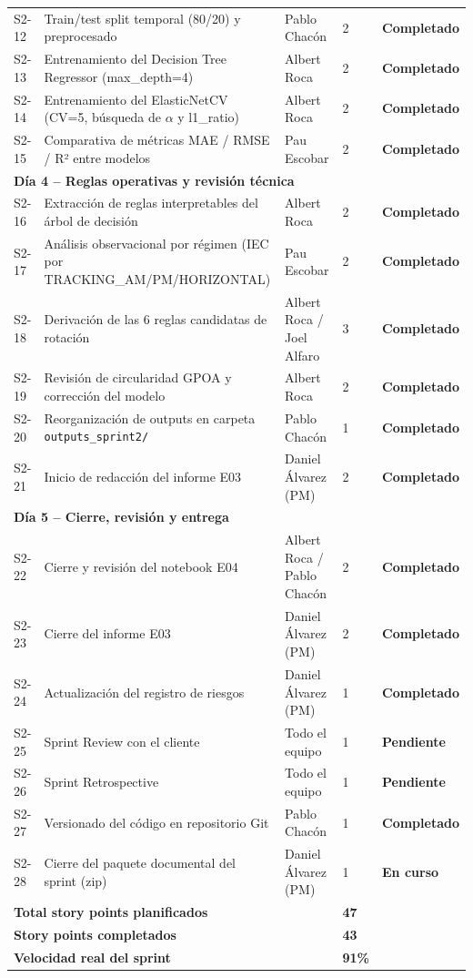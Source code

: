 \documentclass[12pt,a4paper]{article}
\newcommand{\done}{\textcolor{completed}{\textbf{Completado}}}
\newcommand{\pend}{\textcolor{pending}{\textbf{Pendiente}}}
\newcommand{\inpr}{\textcolor{inprogress}{\textbf{En curso}}}
\begin{document}
\begin{longtable}{p{1cm} p{6.5cm} p{3cm} p{0.8cm} p{2cm}}
S2-12 & Train/test split temporal (80/20) y preprocesado & Pablo Chacón & 2 & \done \\
S2-13 & Entrenamiento del Decision Tree Regressor (max\_depth=4) & Albert Roca & 2 & \done \\
S2-14 & Entrenamiento del ElasticNetCV (CV=5, búsqueda de $\alpha$ y l1\_ratio) & Albert Roca & 2 & \done \\
S2-15 & Comparativa de métricas MAE / RMSE / R² entre modelos & Pau Escobar & 2 & \done \\
\midrule
\multicolumn{5}{l}{\textbf{Día 4 -- Reglas operativas y revisión técnica}} \\
\midrule
S2-16 & Extracción de reglas interpretables del árbol de decisión & Albert Roca & 2 & \done \\
S2-17 & Análisis observacional por régimen (IEC por TRACKING\_AM/PM/HORIZONTAL) & Pau Escobar & 2 & \done \\
S2-18 & Derivación de las 6 reglas candidatas de rotación & Albert Roca / Joel Alfaro & 3 & \done \\
S2-19 & Revisión de circularidad GPOA y corrección del modelo & Albert Roca & 2 & \done \\
S2-20 & Reorganización de outputs en carpeta \texttt{outputs\_sprint2/} & Pablo Chacón & 1 & \done \\
S2-21 & Inicio de redacción del informe E03 & Daniel Álvarez (PM) & 2 & \done \\
\midrule
\multicolumn{5}{l}{\textbf{Día 5 -- Cierre, revisión y entrega}} \\
\midrule
S2-22 & Cierre y revisión del notebook E04 & Albert Roca / Pablo Chacón & 2 & \done \\
S2-23 & Cierre del informe E03 & Daniel Álvarez (PM) & 2 & \done \\
S2-24 & Actualización del registro de riesgos & Daniel Álvarez (PM) & 1 & \done \\
S2-25 & Sprint Review con el cliente & Todo el equipo & 1 & \pend \\
S2-26 & Sprint Retrospective & Todo el equipo & 1 & \pend \\
S2-27 & Versionado del código en repositorio Git & Pablo Chacón & 1 & \done \\
S2-28 & Cierre del paquete documental del sprint (zip) & Daniel Álvarez (PM) & 1 & \inpr \\
\midrule
\multicolumn{2}{l}{\textbf{Total story points planificados}} & & \textbf{47} & \\
\multicolumn{2}{l}{\textbf{Story points completados}} & & \textbf{43} & \\
\multicolumn{2}{l}{\textbf{Velocidad real del sprint}} & & \textbf{91\%} & \\
\end{longtable}
\end{document}
